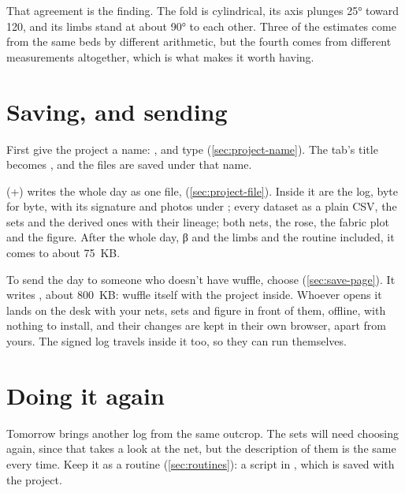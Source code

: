 That agreement is the finding. The fold is cylindrical, its axis plunges 25° toward 120, and its limbs
stand at about 90° to each other. Three of the estimates come from the same beds by different
arithmetic, but the fourth comes from different measurements altogether, which is what makes it
worth having.

\section{Saving, and sending}\label{sec:wf-save}

First give the project a name: , and type 
(\cref{sec:project-name}). The tab's title becomes , and the files are
saved under that name.

 (+) writes the whole day as one file,
 (\cref{sec:project-file}). Inside it are the log, byte for byte, with
its signature and photos under ; every dataset as a plain CSV, the sets and the derived ones
with their lineage; both nets, the rose, the fabric plot and the figure. After the whole day, β and the
limbs and the routine included, it comes to about 75~KB.

To send the day to someone who doesn't have wuffle, choose  (\cref{sec:save-page}). It writes , about 800~KB:
wuffle itself with the project inside. Whoever opens it lands on the desk with your nets, sets and figure in
front of them, offline, with nothing to install, and their changes are kept in their own browser, apart
from yours. The signed log travels inside it too, so they can run  themselves.

\section{Doing it again}\label{sec:wf-routine}

Tomorrow brings another log from the same outcrop. The sets will need choosing again, since that takes
a look at the net, but the description of them is the same every time. Keep it as a routine
(\cref{sec:routines}): a script in , which is saved with the project.

